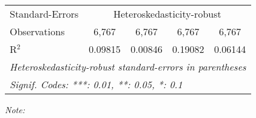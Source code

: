 \begin{table}[htbp!]
\begin{adjustbox}{width = 1\textwidth, max height = 0.95\textheight, center}
\begin{threeparttable}[b]
\begin{tabular}{lcccc}
            \midrule 
            Standard-Errors & \multicolumn{4}{c}{Heteroskedasticity-robust} \\ 
            Observations         & 6,767                         & 6,767                          & 6,767                          & 6,767\\  
            R$^2$                & 0.09815                       & 0.00846                        & 0.19082                        & 0.06144\\  
            \midrule \midrule
            \multicolumn{5}{l}{\emph{Heteroskedasticity-robust standard-errors in parentheses}}\\
            \multicolumn{5}{l}{\emph{Signif. Codes: ***: 0.01, **: 0.05, *: 0.1}}\\
         \end{tabular}
         
         \begin{tablenotes}\item \medskip \textit{Note:}
         \end{tablenotes}
      \end{threeparttable}
   \end{adjustbox}
\end{table}


